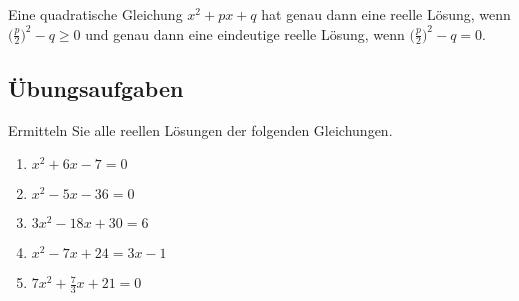\documentclass[../../main.tex]{subfiles}
\begin{document}
\begin{corollary}
Eine quadratische Gleichung $x^2+px+q$ hat genau dann eine reelle Lösung, wenn $\Big(\frac{p}{2}\Big)^2-q\geq 0$ und genau dann eine eindeutige reelle Lösung, wenn $\Big(\frac{p}{2}\Big)^2-q=0$.
\end{corollary}
\subsection*{Übungsaufgaben}
Ermitteln Sie alle reellen Lösungen der folgenden Gleichungen.
\begin{enumerate}
    \item $x^2+6x-7=0$
    \item $x^2-5x-36=0$
    \item $3x^2-18x+30=6$
    \item $x^2-7x+24=3x-1$
    \item $7x^2+\frac{7}{3}x+21=0$
\end{enumerate}
\end{document}
